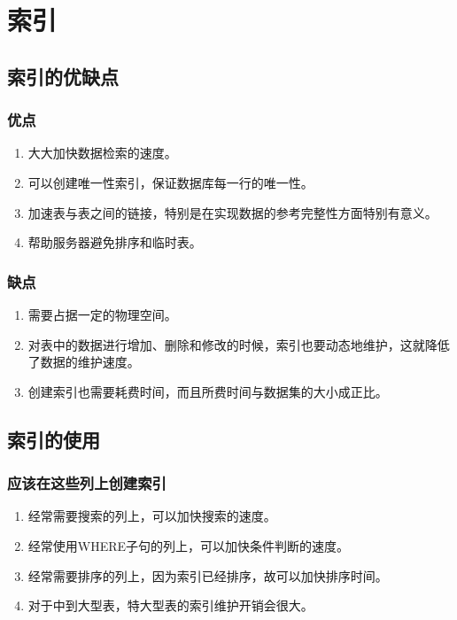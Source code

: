 \documentclass[a4paper]{report}
\begin{document}
\section{索引}
\subsection{索引的优缺点}
\subsubsection{优点}
\begin{enumerate}
    \item 大大加快数据检索的速度。
    \item 可以创建唯一性索引，保证数据库每一行的唯一性。
    \item 加速表与表之间的链接，特别是在实现数据的参考完整性方面特别有意义。
    \item 帮助服务器避免排序和临时表。
\end{enumerate}
\subsubsection{缺点}
\begin{enumerate}
    \item 需要占据一定的物理空间。
    \item 对表中的数据进行增加、删除和修改的时候，索引也要动态地维护，这就降低了数据的维护速度。
    \item 创建索引也需要耗费时间，而且所费时间与数据集的大小成正比。
\end{enumerate}

\subsection{索引的使用}
\subsubsection{应该在这些列上创建索引}
\begin{enumerate}
    \item 经常需要搜索的列上，可以加快搜索的速度。
    \item 经常使用WHERE子句的列上，可以加快条件判断的速度。
    \item 经常需要排序的列上，因为索引已经排序，故可以加快排序时间。
    \item 对于中到大型表，特大型表的索引维护开销会很大。
\end{enumerate}
\end{document}
